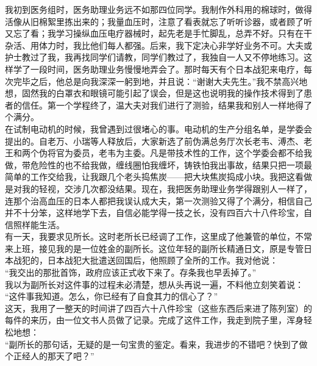 我初到医务组时，医务助理业务远不如那四位同学。我制作外科用的棉球时，做得活像从旧棉絮里拣出来的；我量血压时，注意了看表就忘了听听诊器，或者顾了听又忘了看；我学习操纵血压电疗器械时，起先老是手忙脚乱，总弄不好。只有在干杂活、用体力时，我比他们每人都强。后来，我下定决心非学好业务不可。大夫或护士教过了我，我再找同学们请教，同学们教过了，我独自一人又不停地练习。这样学了一段时间，医务助理业务慢慢地弄会了。那时每天有个日本战犯来电疗，每次完毕之后，他总是向我深深一躬到地，并且说：“谢谢大夫先生。”我不禁高兴地想，固然我的白罩衣和眼镜可能引起了误会，但是这也说明我的操作技术得到了患者的信任。第一个学程终了，温大夫对我们进行了测验，结果我和别人一样地得了个满分。\\

在试制电动机的时候，我曾遇到过很堵心的事。电动机的生产分组名单，是学委会提出的。自老万、小瑞等人释放后，大家新选了前伪满总务厅次长老韦、溥杰、老王和两个伪将官为委员，老韦为主委。凡是带技术性的工作，这个学委会都不给我做，带危险性的也不给我做，缠线圈怕我缠坏，铸铁怕我出事故，结果只把一项最简单的工作交给我，让我跟几个老头捣焦炭——把大块焦炭捣成小块。我把这看做是对我的轻视，交涉几次都没结果。现在，我把医务助理业务学得跟别人一样了，连那个治高血压的日本人都把我误认成大夫，第一次测验又得了个满分，相信自己并不十分笨，这样地学下去，自信必能学得一技之长，没有四百六十八件珍宝，自信照样能生活。\\

有一天，我要求见所长。这时老所长已经调了工作，这里成了他兼管的单位，不常来上班，接见我的是一位姓金的副所长。这位年轻的副所长精通日文，原是专管日本战犯的，日本战犯大批遣送回国后，他照顾了全所的工作。我对他说：\\

“我交出的那批首饰，政府应该正式收下来了。存条我也早丢掉了。”\\

我以为副所长对这件事的过程未必清楚，想从头再说一遍，不料他立刻笑着说：\\

“这件事我知道。怎么，你已经有了自食其力的信心了？”\\

这天，我用了一整天的时间讲了四百六十八件珍宝（这些东西后来进了陈列室）的每件的来历，由一位文书人员做了记录。完成了这件工作，我走到院子里，浑身轻松地想：\\

“副所长的那句话，无疑的是一句宝贵的鉴定。看来，我进步的不错吧？快到了做个正经人的那天了吧？”\\